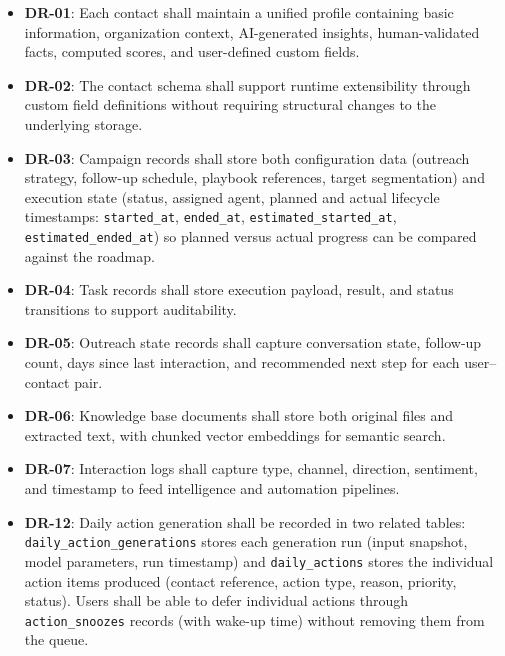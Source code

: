 \documentclass[a4paper]{article}
\begin{document}
\begin{itemize}
    \item \textbf{DR-01}: Each contact shall maintain a unified
    profile containing basic information, organization context,
    AI-generated insights, human-validated facts, computed scores,
    and user-defined custom fields.

    \item \textbf{DR-02}: The contact schema shall support runtime
    extensibility through custom field definitions without
    requiring structural changes to the underlying storage.

    \item \textbf{DR-03}: Campaign records shall store both
    configuration data (outreach strategy, follow-up schedule,
    playbook references, target segmentation) and execution state
    (status, assigned agent, planned and actual lifecycle
    timestamps: \texttt{started\_at}, \texttt{ended\_at},
    \texttt{estimated\_started\_at},
    \texttt{estimated\_ended\_at}) so planned versus actual
    progress can be compared against the roadmap.

    \item \textbf{DR-04}: Task records shall store execution
    payload, result, and status transitions to support
    auditability.

    \item \textbf{DR-05}: Outreach state records shall capture
    conversation state, follow-up count, days since last
    interaction, and recommended next step for each user--contact
    pair.

    \item \textbf{DR-06}: Knowledge base documents shall store
    both original files and extracted text, with chunked vector
    embeddings for semantic search.

    \item \textbf{DR-07}: Interaction logs shall capture type,
    channel, direction, sentiment, and timestamp to feed
    intelligence and automation pipelines.

    \item \textbf{DR-12}: Daily action generation shall be
    recorded in two related tables:
    \texttt{daily\_action\_generations} stores each generation
    run (input snapshot, model parameters, run timestamp) and
    \texttt{daily\_actions} stores the individual action items
    produced (contact reference, action type, reason, priority,
    status). Users shall be able to defer individual actions
    through \texttt{action\_snoozes} records (with wake-up time)
    without removing them from the queue.


\end{itemize}
\end{document}
